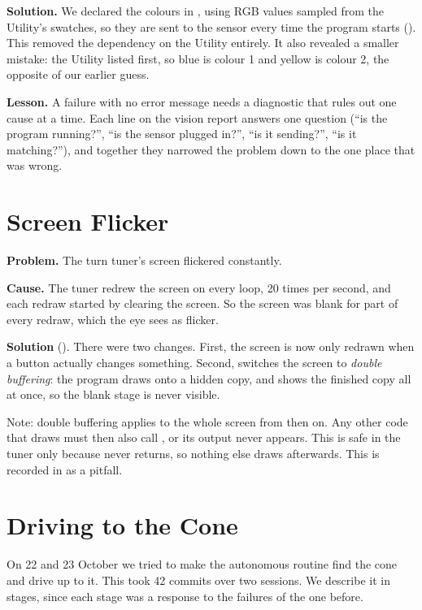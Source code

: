 \textbf{Solution.} We declared the colours in , using RGB values
sampled from the Utility's swatches, so they are sent to the sensor every time
the program starts (). This removed the dependency on the
Utility entirely. It also revealed a smaller mistake: the Utility listed
 first, so blue is colour 1 and yellow is colour 2, the opposite of
our earlier guess.

\textbf{Lesson.} A failure with no error message needs a diagnostic that rules
out one cause at a time. Each line on the vision report answers one question
(``is the program running?'', ``is the sensor plugged in?'', ``is it sending?'',
``is it matching?''), and together they narrowed the problem down to the one
place that was wrong.

\section{Screen Flicker}
\label{sec:ch-flicker}

\textbf{Problem.} The turn tuner's screen flickered constantly.

\textbf{Cause.} The tuner redrew the screen on every loop, 20 times per second,
and each redraw started by clearing the screen. So the screen was blank for part
of every redraw, which the eye sees as flicker.

\textbf{Solution} (). There were two changes. First, the screen
is now only redrawn when a button actually changes something. Second,
 switches the screen to \emph{double buffering}: the
program draws onto a hidden copy, and  shows the finished copy all
at once, so the blank stage is never visible.

Note: double buffering applies to the whole screen from then on. Any other code
that draws must then also call , or its output never appears. This
is safe in the tuner only because  never returns, so nothing
else draws afterwards. This is recorded in  as a pitfall.

\section{Driving to the Cone}
\label{sec:ch-cone}

On 22 and 23 October we tried to make the autonomous routine find the cone and
drive up to it. This took 42 commits over two sessions. We describe it in
stages, since each stage was a response to the failures of the one before.


